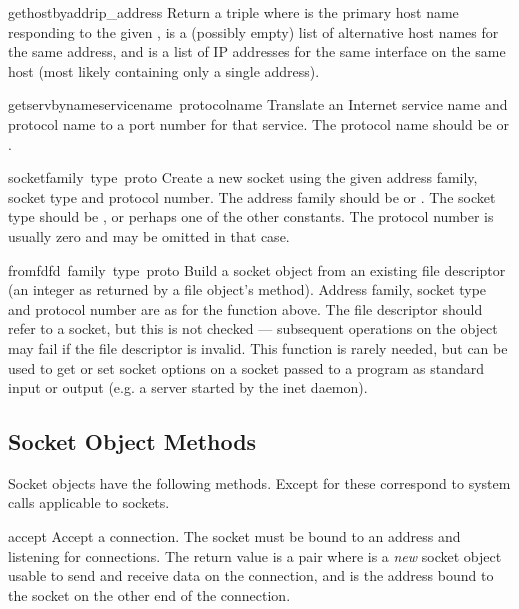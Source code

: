 \begin{funcdesc}{gethostbyaddr}{ip_address}
Return a triple  where
 is the primary host name responding to the given
,  is a (possibly empty) list of
alternative host names for the same address, and  is
a list of IP addresses for the same interface on the same
host (most likely containing only a single address).
\end{funcdesc}

\begin{funcdesc}{getservbyname}{servicename\, protocolname}
Translate an Internet service name and protocol name to a port number
for that service.  The protocol name should be  or
.
\end{funcdesc}

\begin{funcdesc}{socket}{family\, type\, proto}
Create a new socket using the given address family, socket type and
protocol number.  The address family should be  or
.  The socket type should be ,
 or perhaps one of the other  constants.
The protocol number is usually zero and may be omitted in that case.
\end{funcdesc}

\begin{funcdesc}{fromfd}{fd\, family\, type\, proto}
Build a socket object from an existing file descriptor (an integer as
returned by a file object's  method).  Address family,
socket type and protocol number are as for the  function
above.  The file descriptor should refer to a socket, but this is not
checked --- subsequent operations on the object may fail if the file
descriptor is invalid.  This function is rarely needed, but can be
used to get or set socket options on a socket passed to a program as
standard input or output (e.g. a server started by the \UNIX{} inet
daemon).
\end{funcdesc}

\subsection{Socket Object Methods}

\noindent
Socket objects have the following methods.  Except for
 these correspond to \UNIX{} system calls applicable to
sockets.

\renewcommand{\indexsubitem}{(socket method)}
\begin{funcdesc}{accept}{}
Accept a connection.
The socket must be bound to an address and listening for connections.
The return value is a pair 
where  is a \emph{new} socket object usable to send and
receive data on the connection, and  is the address bound
to the socket on the other end of the connection.
\end{funcdesc}

